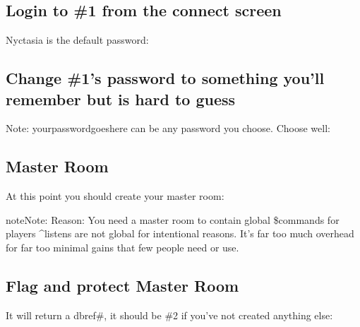 \documentclass[letterpaper,10pt,english]{sphinxmanual}
\begin{document}
\subsection{Login to \#1 from the connect screen}
\label{\detokenize{gettingstarted:login-to-1-from-the-connect-screen}}
\sphinxAtStartPar
Nyctasia is the default password:

\begin{sphinxVerbatim}[commandchars=\\\{\}]
 
\end{sphinxVerbatim}


\subsection{Change \#1’s password to something you’ll remember but is hard to guess}
\label{\detokenize{gettingstarted:change-1-s-password-to-something-you-ll-remember-but-is-hard-to-guess}}
\sphinxAtStartPar
Note: yourpasswordgoeshere can be any password you choose.  Choose well:

\begin{sphinxVerbatim}[commandchars=\\\{\}]
 
\end{sphinxVerbatim}


\subsection{Master Room}
\label{\detokenize{gettingstarted:master-room}}
\sphinxAtStartPar
At this point you should create your master room:

\begin{sphinxVerbatim}[commandchars=\\\{\}]
  
\end{sphinxVerbatim}

\begin{sphinxadmonition}{note}{Note:}
\sphinxAtStartPar
Reason: You need a master room to contain global \$commands for players
\textasciicircum{}listens are not global for intentional reasons.  It’s far too much overhead for far too minimal gains that few people need or use.
\end{sphinxadmonition}


\subsection{Flag and protect Master Room}
\label{\detokenize{gettingstarted:flag-and-protect-master-room}}
\sphinxAtStartPar
It will return a dbref\#, it should be \#2 if you’ve not created anything else:
\end{document}
